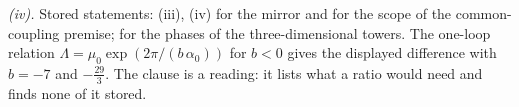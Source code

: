 \emph{(iv).} Stored statements: (iii), (iv) for the mirror and for the scope of the common-coupling premise;  for the phases of the three-dimensional towers. The one-loop relation $\Lambda = \mu_{0}\exp(2\pi/(b\,\alpha_{0}))$ for $b < 0$ gives the displayed difference with $b = -7$ and $-\tfrac{29}{3}$. The clause is a reading: it lists what a ratio would need and finds none of it stored.

